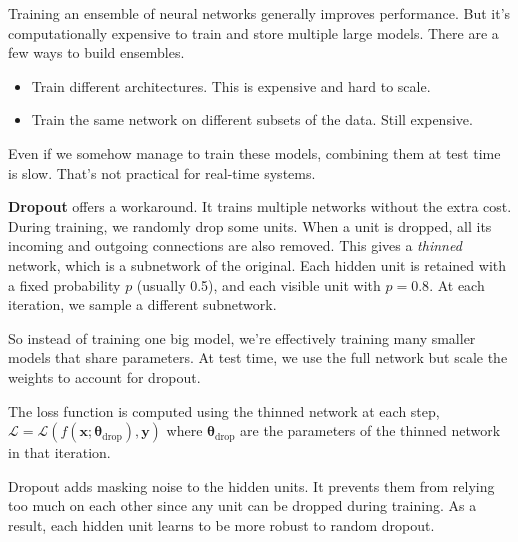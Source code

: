 Training an ensemble of neural networks generally improves performance. But it's computationally expensive to train and store multiple large models. There are a few ways to build ensembles. 
\begin{itemize}
    \item Train different architectures. This is expensive and hard to scale.
    \item Train the same network on different subsets of the data. Still expensive.
\end{itemize}
Even if we somehow manage to train these models, combining them at test time is slow. That’s not practical for real-time systems.


\textbf{Dropout} offers a workaround. It trains multiple networks without the extra cost. During training, we randomly drop some units. When a unit is dropped, all its incoming and outgoing connections are also removed. This gives a \textit{thinned} network, which is a subnetwork of the original. Each hidden unit is retained with a fixed probability $p$ (usually 0.5), and each visible unit with $p = 0.8$. At each iteration, we sample a different subnetwork.

So instead of training one big model, we’re effectively training many smaller models that share parameters. At test time, we use the full network but scale the weights to account for dropout.

The loss function is computed using the thinned network at each step,
\(
\mathcal{L} = \mathcal{L}\left( f(\mathbf{x}; \boldsymbol{\theta}_{\text{drop}}), \mathbf{y} \right)
\)
where $\boldsymbol{\theta}_{\text{drop}}$ are the parameters of the thinned network in that iteration.

Dropout adds masking noise to the hidden units. It prevents them from relying too much on each other since any unit can be dropped during training. As a result, each hidden unit learns to be more robust to random dropout.

